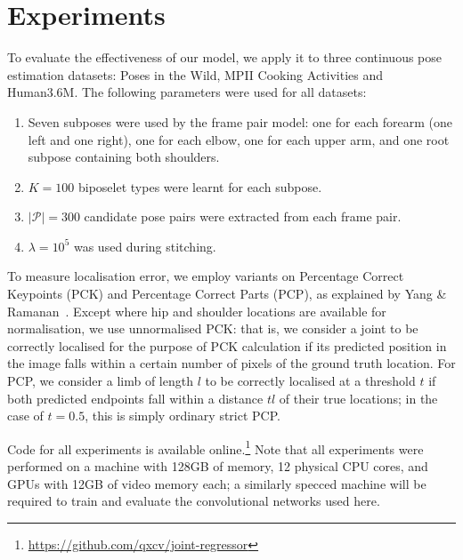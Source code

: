\documentclass[runningheads]{llncs}
\begin{document}
\section{Experiments}\label{sec:experiments}


To evaluate the effectiveness of our model, we apply it to three continuous pose
estimation datasets: Poses in the Wild, MPII Cooking Activities and Human3.6M.
The following parameters were used for all datasets:

\begin{enumerate}
\item Seven subposes were used by the frame pair model: one for each forearm
(one left and one right), one for each elbow, one for each upper arm, and one
root subpose containing both shoulders.
\item $K = 100$ biposelet types were learnt for each subpose.
\item $|\mathcal P| = 300$ candidate pose pairs were extracted from each frame
pair.
\item $\lambda = 10^5$ was used during stitching.
\end{enumerate}

To measure localisation error, we employ variants on Percentage Correct
Keypoints (PCK) and Percentage Correct Parts (PCP), as explained by Yang \&
Ramanan~\cite{yang2013articulated}. Except where hip and shoulder locations are
available for normalisation, we use unnormalised PCK: that is, we consider a
joint to be correctly localised for the purpose of PCK calculation if its
predicted position in the image falls within a certain number of pixels of the
ground truth location. For PCP, we consider a limb of length $l$ to be correctly
localised at a threshold $t$ if both predicted endpoints fall within a distance
$tl$ of their true locations; in the case of $t = 0.5$, this is simply ordinary
strict PCP.

Code for all experiments is available
online.\footnote{\url{https://github.com/qxcv/joint-regressor}} Note that all
experiments were performed on a machine with 128GB of memory, 12 physical CPU
cores, and GPUs with 12GB of video memory each; a similarly specced machine will
be required to train and evaluate the convolutional networks used here.
\end{document}
